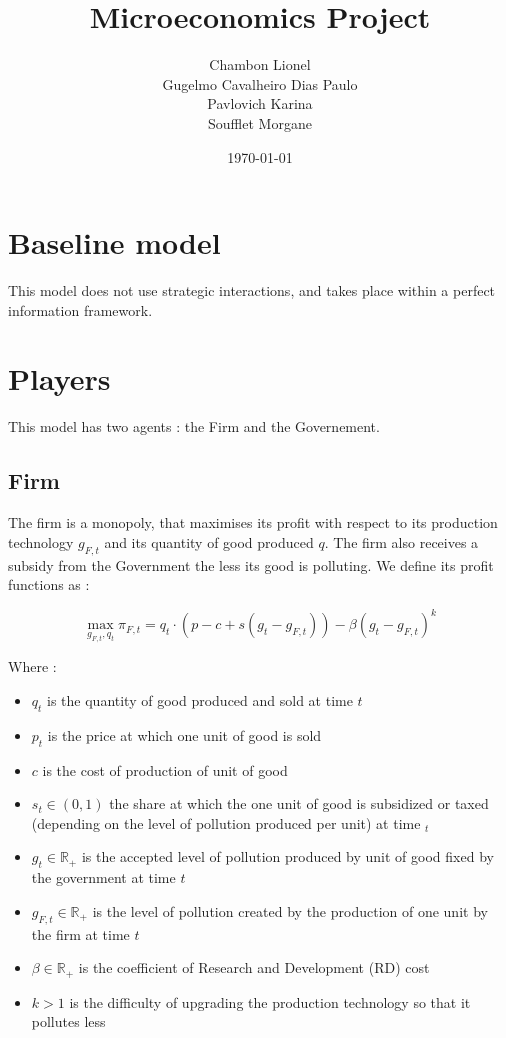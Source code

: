 \documentclass{article}
\title{Microeconomics Project}
\author{Chambon Lionel \\ Gugelmo Cavalheiro Dias Paulo \\ Pavlovich Karina \\ Soufflet Morgane}
\date{\today}
\begin{document}
\maketitle

\section{Baseline model}

This model does not use strategic interactions, and takes place within a perfect information framework. 

\section{Players}

This model has two agents : the Firm and the Governement. 

\subsection{Firm}

The firm is a monopoly, that maximises its profit with respect to its production technology $g_{F,t}$ and its quantity of good produced $q$. The firm also receives a subsidy from the Government the less its good is polluting. We define its profit functions as : 

\begin{equation}
    \max_{g_{F,t},q_{t}}{\pi_{F,t}=q_{t}\cdot\left(p-c+s(g_{t}-g_{F,t})\right)-\beta(g_{t}-g_{F,t})^{k}}
\end{equation}

Where : 
\begin{itemize}
    \item $q_{t}$ is the quantity of good produced and sold at time $t$
    \item $p_{t}$ is the price at which one unit of good is sold
    \item $c$ is the cost of production of unit of good
    \item $s_{t}\in\left(0,1\right)$ the share at which the one unit of good is subsidized or taxed (depending on the level of pollution produced per unit) at time $_{t}$
    \item $g_{t}\in\mathbb{R}_{+}$ is the accepted level of pollution produced by unit of good fixed by the government at time $t$
    \item $g_{F,t}\in\mathbb{R}_{+}$ is the level of pollution created by the production of one unit by the firm at time $t$
    \item $\beta\in\mathbb{R}_{+}$ is the coefficient of Research and Development (RD) cost
    \item $k>1$ is the difficulty of upgrading the production technology so that it pollutes less
\end{itemize}
\end{document}
